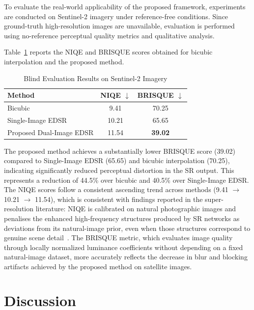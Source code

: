 \documentclass[conference]{IEEEtran}
\begin{document}
To evaluate the real-world applicability of the proposed framework, experiments are conducted on Sentinel-2 imagery under reference-free conditions. Since ground-truth high-resolution images are unavailable, evaluation is performed using no-reference perceptual quality metrics and qualitative analysis.

Table~\ref{tab:sentinel_results} reports the NIQE and BRISQUE scores obtained for bicubic interpolation and the proposed method.

\begin{table}[t]
\centering
\caption{Blind Evaluation Results on Sentinel-2 Imagery}
\label{tab:sentinel_results}
\begin{tabular}{lcc}
\toprule
Method & NIQE $\downarrow$ & BRISQUE $\downarrow$ \\
\midrule
Bicubic & 9.41 & 70.25 \\
Single-Image EDSR & 10.21 & 65.65 \\
Proposed Dual-Image EDSR & 11.54 & \textbf{39.02} \\
\bottomrule
\end{tabular}
\end{table}

The proposed method achieves a substantially lower BRISQUE score (39.02) compared to Single-Image EDSR (65.65) and bicubic interpolation (70.25), indicating significantly reduced perceptual distortion in the SR output. This represents a reduction of 44.5\% over bicubic and 40.5\% over Single-Image EDSR. The NIQE scores follow a consistent ascending trend across methods (9.41 $\rightarrow$ 10.21 $\rightarrow$ 11.54), which is consistent with findings reported in the super-resolution literature: NIQE is calibrated on natural photographic images and penalises the enhanced high-frequency structures produced by SR networks as deviations from its natural-image prior, even when those structures correspond to genuine scene detail~\cite{mittal2013niqe}. The BRISQUE metric, which evaluates image quality through locally normalized luminance coefficients without depending on a fixed natural-image dataset, more accurately reflects the decrease in blur and blocking artifacts achieved by the proposed method on satellite images.

\section{Discussion}
\end{document}
